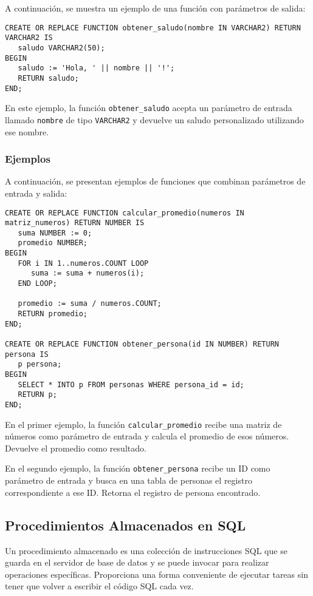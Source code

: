 \documentclass[executivepaper]{article}
\begin{document}
A continuación, se muestra un ejemplo de una función con parámetros de salida:

\begin{lstlisting}
CREATE OR REPLACE FUNCTION obtener_saludo(nombre IN VARCHAR2) RETURN VARCHAR2 IS
   saludo VARCHAR2(50);
BEGIN
   saludo := 'Hola, ' || nombre || '!';
   RETURN saludo;
END;
\end{lstlisting}

En este ejemplo, la función \texttt{obtener\_saludo} acepta un parámetro de entrada llamado \texttt{nombre} de tipo \texttt{VARCHAR2} y devuelve un saludo personalizado utilizando ese nombre.

\subsubsection*{Ejemplos}

A continuación, se presentan ejemplos de funciones que combinan parámetros de entrada y salida:

\begin{lstlisting}
CREATE OR REPLACE FUNCTION calcular_promedio(numeros IN matriz_numeros) RETURN NUMBER IS
   suma NUMBER := 0;
   promedio NUMBER;
BEGIN
   FOR i IN 1..numeros.COUNT LOOP
      suma := suma + numeros(i);
   END LOOP;
   
   promedio := suma / numeros.COUNT;
   RETURN promedio;
END;

CREATE OR REPLACE FUNCTION obtener_persona(id IN NUMBER) RETURN persona IS
   p persona;
BEGIN
   SELECT * INTO p FROM personas WHERE persona_id = id;
   RETURN p;
END;
\end{lstlisting}

En el primer ejemplo, la función \texttt{calcular\_promedio} recibe una matriz de números como parámetro de entrada y calcula el promedio de esos números. Devuelve el promedio como resultado.

En el segundo ejemplo, la función \texttt{obtener\_persona} recibe un ID como parámetro de entrada y busca en una tabla de personas el registro correspondiente a ese ID. Retorna el registro de persona encontrado.

\subsection{Procedimientos Almacenados en SQL}

Un procedimiento almacenado es una colección de instrucciones SQL que se guarda en el servidor de base de datos y se puede invocar para realizar operaciones específicas. Proporciona una forma conveniente de ejecutar tareas sin tener que volver a escribir el código SQL cada vez.
\end{document}
